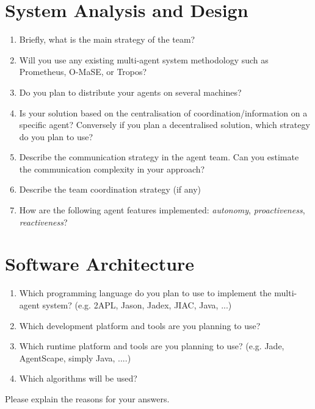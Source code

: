 \documentclass{llncs}
\begin{document}
\section*{System Analysis and Design}

\begin{enumerate}
  \item Briefly, what is the main strategy of the team?
  \item Will you use any existing multi-agent system
  methodology such as Prometheus, O-MaSE, or Tropos?
 \item Do you plan to distribute your agents on several machines?
 \item Is your solution based on the centralisation of
   coordination/information on a specific agent? Conversely if you
   plan a decentralised solution, which strategy do you plan to use?
\item Describe the communication strategy in the agent team. Can you
   estimate the communication complexity in your approach?
 \item Describe the team coordination strategy (if any)
 \item How are the following agent features implemented:
   \emph{autonomy}, \emph{proactiveness}, \emph{reactiveness}?
\end{enumerate}



\section*{Software Architecture}

\begin{enumerate}
\item Which programming language do you plan to use to implement the
  multi-agent system? (e.g. 2APL, Jason, Jadex, JIAC, Java, ...)
\item Which development platform and tools are you planning to use?
\item Which runtime platform and tools are you planning to use?
  (e.g. Jade, AgentScape, simply Java, ....)
\item Which algorithms will be used?
\end{enumerate}
Please explain the reasons for your answers.
\end{document}
